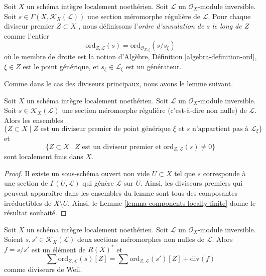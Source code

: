 \begin{definition}
\label{definition-order-vanishing-meromorphic}
Soit  $X$  un schéma intègre localement noethérien. Soit  $\mathcal{L}$  un
 $\mathcal{O}_X$-module inversible. Soit  $s \in \Gamma(X, \mathcal{K}_X(\mathcal{L}))$  une section méromorphe régulière
de  $\mathcal{L}$. Pour chaque diviseur premier  $Z \subset X$ , nous définissons
l'{\it ordre d'annulation de  $s$  le long de
 $Z$}  comme l'entier
$$
\text{ord}_{Z, \mathcal{L}}(s)
= \text{ord}_{\mathcal{O}_{X, \xi}}(s/s_\xi)
$$
où le membre de droite est la notion d'Algèbre, Définition  \ref{algebra-definition-ord},  $\xi \in Z$
est le point générique, et  $s_\xi \in \mathcal{L}_\xi$  est un générateur.
\end{definition}

\noindent
Comme dans le cas des diviseurs principaux, nous avons le lemme suivant.

\begin{lemma}
\label{lemma-divisor-meromorphic-locally-finite}
Soit  $X$  un schéma intègre localement noethérien. Soit  $\mathcal{L}$  un
 $\mathcal{O}_X$-module inversible. Soit  $s \in \mathcal{K}_X(\mathcal{L})$  une section méromorphe régulière
(c’est-à-dire non nulle) de  $\mathcal{L}$. Alors les ensembles
$$
\{Z \subset X \mid Z \text{ est un diviseur premier de point générique }\xi
\text{ et }s\text{ n'appartient pas à }\mathcal{L}_\xi\}
$$
et
$$
\{Z \subset X \mid Z \text{ est un diviseur premier et }
\text{ord}_{Z, \mathcal{L}}(s) \not = 0\}
$$
sont localement finis dans  $X$.
\end{lemma}

\begin{proof}
Il existe un sous-schéma ouvert non vide  $U \subset X$  tel que  $s$ 
corresponde à une section de  $\Gamma(U, \mathcal{L})$  qui génère  $\mathcal{L}$  sur
 $U$. Ainsi, les diviseurs premiers qui peuvent apparaître dans les
ensembles du lemme sont tous des composantes irréductibles de  $X \setminus U$. Ainsi,
le Lemme  \ref{lemma-components-locally-finite} donne le résultat souhaité.
\end{proof}

\begin{lemma}
\label{lemma-divisor-meromorphic-well-defined}
Soit  $X$  un schéma intègre localement noethérien. Soit  $\mathcal{L}$  un
 $\mathcal{O}_X$-module inversible. Soient  $s, s' \in \mathcal{K}_X(\mathcal{L})$  deux sections méromorphes non nulles
de  $\mathcal{L}$. Alors  $f = s/s'$  est un élément de  $R(X)^*$  et
$$
\sum \text{ord}_{Z, \mathcal{L}}(s)[Z]
=
\sum \text{ord}_{Z, \mathcal{L}}(s')[Z]
+
\text{div}(f)
$$
comme diviseurs de Weil.
\end{lemma}

